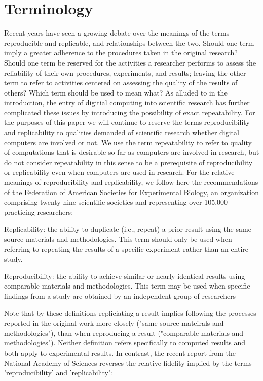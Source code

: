 \section{Terminology}

	Recent years have seen a growing debate over the meanings of the terms reproducible and replicable,
		and relationships between the two.  Should one term imply a greater adherence to the procedures
		taken in the original research?  Should one term be reserved for the activities a researcher performs
		to assess the reliability of their own procedures, experiments, and results; leaving the other term to
		refer to activities centered on assessing the quality of the results of others?  Which term should be used
		to mean what? As alluded to in the introduction, the entry of digitial computing into scientific research
		has further complicated these issues by introducing the possibility of exact repeatability.
	For the purposes of this paper we will continue to reserve the terms reproducibility and replicability to
		qualities demanded of scientific research whether digital computers are involved or not.  We use the
		term repeatability to refer to quality of computations that is desirable so far as computers are involved
		in research, but do not consider repeatability in this sense to be a prerequisite of reproducibility or
		replicability even when computers are used in research.
	For the relative meanings of reproducibility and replicability, we follow here the recommendations of the Federation 
		of American Societies for Experimental Biology, an organization comprising twenty-nine scientific 
		societies and representing over 105,000 practicing researchers:

		Replicability: the ability to duplicate (i.e., repeat) a prior result using the same
		source materials and methodologies. This term should only be used when
		referring to repeating the results of a specific experiment rather than an
		entire study.

		Reproducibility: the ability to achieve similar or nearly identical results using comparable materials and methodologies. 
		This term may be used when specific findings from a study are obtained by an independent group of researchers

	Note that by these definitions repliciating a result implies following the processes reported in the original work more closely ("same 
		source mateirals and methodologies"), than when reproducing a result ("comparable materials and methodologies").  
	Neither definition refers specifically to computed results and both apply to experimental results.  In contrast, the recent report from the National
		Academy of Sciences reverses the relative fidelity implied by the terms 'reproducibility' and 'replicability':

